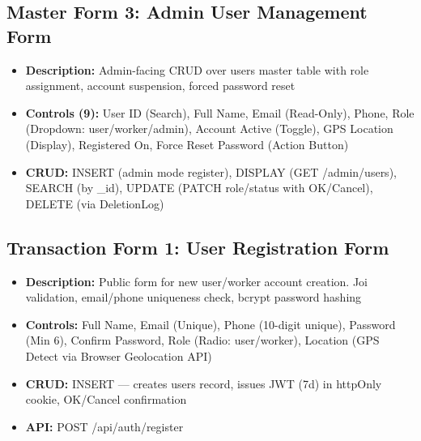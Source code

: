 \documentclass[12pt,a4paper]{article}
\begin{document}
\subsection*{Master Form 3: Admin User Management Form}
\begin{itemize}[leftmargin=*]
    \item \textbf{Description:} Admin-facing CRUD over users master table with role assignment, account suspension, forced password reset
    \item \textbf{Controls (9):} User ID (Search), Full Name, Email (Read-Only), Phone, Role (Dropdown: user/worker/admin), Account Active (Toggle), GPS Location (Display), Registered On, Force Reset Password (Action Button)
    \item \textbf{CRUD:} INSERT (admin mode register), DISPLAY (GET /admin/users), SEARCH (by \_id), UPDATE (PATCH role/status with OK/Cancel), DELETE (via DeletionLog)
\end{itemize}

\subsection*{Transaction Form 1: User Registration Form}
\begin{itemize}[leftmargin=*]
    \item \textbf{Description:} Public form for new user/worker account creation. Joi validation, email/phone uniqueness check, bcrypt password hashing
    \item \textbf{Controls:} Full Name, Email (Unique), Phone (10-digit unique), Password (Min 6), Confirm Password, Role (Radio: user/worker), Location (GPS Detect via Browser Geolocation API)
    \item \textbf{CRUD:} INSERT — creates users record, issues JWT (7d) in httpOnly cookie, OK/Cancel confirmation
    \item \textbf{API:} POST /api/auth/register
\end{itemize}
\end{document}
